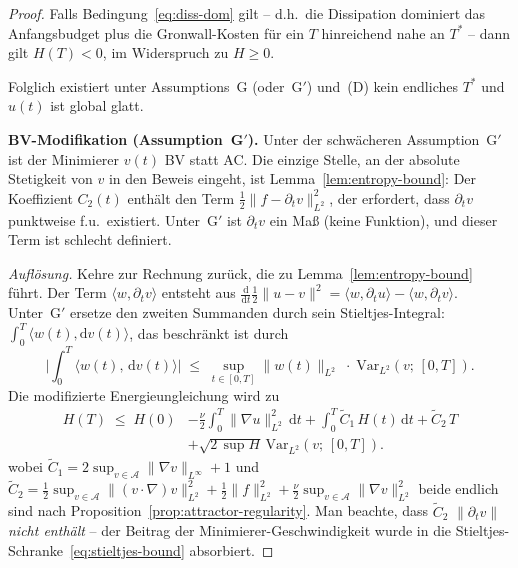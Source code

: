 \documentclass[12pt,a4paper]{article}
\theoremstyle{definition}
\theoremstyle{plain}
\theoremstyle{remark}
\begin{document}
\begin{proof}
Falls Bedingung~\eqref{eq:diss-dom} gilt -- d.h.\ die Dissipation
dominiert das Anfangsbudget plus die Gronwall-Kosten für ein $T$
hinreichend nahe an $T^*$ -- dann gilt $H(T) < 0$, im Widerspruch zu
$H \ge 0$.

Folglich existiert unter Assumptions~G (oder~G$'$) und~(D) kein endliches $T^*$
und $u(t)$ ist global glatt.

\medskip
\noindent\textbf{BV-Modifikation (Assumption~G$'$).}\;
Unter der schwächeren Assumption~G$'$ ist der Minimierer $v(t)$ BV statt
AC. Die einzige Stelle, an der absolute Stetigkeit von $v$ in den
Beweis eingeht, ist Lemma~\ref{lem:entropy-bound}: Der Koeffizient
$C_2(t)$ enthält den Term $\tfrac{1}{2}\|f - \partial_t v\|_{L^2}^2$,
der erfordert, dass $\partial_t v$ punktweise f.u.\ existiert. Unter~G$'$
ist $\partial_t v$ ein Maß (keine Funktion), und dieser Term ist
schlecht definiert.

\emph{Auflösung.}\;
Kehre zur Rechnung zurück, die zu Lemma~\ref{lem:entropy-bound} führt.
Der Term $\langle w, \partial_t v\rangle$ entsteht aus
$\frac{\mathrm{d}}{\mathrm{d}t}\tfrac{1}{2}\|u-v\|^2
= \langle w, \partial_t u\rangle - \langle w, \partial_t v\rangle$.
Unter~G$'$ ersetze den zweiten Summanden durch sein Stieltjes-Integral:
$\int_0^T \langle w(t), \mathrm{d}v(t)\rangle$, das beschränkt ist durch
\begin{equation}\label{eq:stieltjes-bound}
  \biggl|\int_0^T \langle w(t),\, \mathrm{d}v(t)\rangle\biggr|
  \;\le\;
  \sup_{t \in [0,T]} \|w(t)\|_{L^2}
  \;\cdot\;
  \mathrm{Var}_{L^2}(v;\, [0,T]).
\end{equation}
Die modifizierte Energieungleichung wird zu
\begin{equation}\label{eq:H-integral-BV}
\begin{aligned}
  H(T) \;\le\; H(0)
  &-\frac{\nu}{2}\int_0^T \|\nabla u\|_{L^2}^2\,\mathrm{d}t
   + \int_0^T \widetilde{C}_1\,H(t)\,\mathrm{d}t
   + \widetilde{C}_2\,T \\
  &+ \sqrt{2\,\sup H}\,
   \mathrm{Var}_{L^2}(v;\,[0,T]).
\end{aligned}
\end{equation}
wobei $\widetilde{C}_1 = 2\sup_{v \in \mathcal{A}}
\|\nabla v\|_{L^\infty} + 1$ und $\widetilde{C}_2 =
\tfrac{1}{2}\sup_{v \in \mathcal{A}}\|(v\cdot\nabla)v\|_{L^2}^2
+ \tfrac{1}{2}\|f\|_{L^2}^2 + \tfrac{\nu}{2}\sup_{v \in \mathcal{A}}
\|\nabla v\|_{L^2}^2$ beide endlich sind nach
Proposition~\ref{prop:attractor-regularity}. Man beachte, dass $\widetilde{C}_2$
$\|\partial_t v\|$ \emph{nicht enthält} -- der Beitrag der Minimierer-Geschwindigkeit
wurde in die Stieltjes-Schranke~\eqref{eq:stieltjes-bound} absorbiert.


\end{proof}
\end{document}
